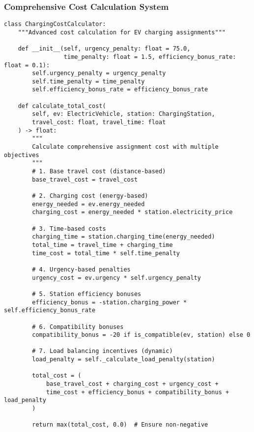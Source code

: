 \documentclass[12pt,a4paper]{article}
\begin{document}
\subsubsection{Comprehensive Cost Calculation System}

\begin{lstlisting}[caption=Multi-Component Cost Calculator,label=lst:cost]
class ChargingCostCalculator:
    """Advanced cost calculation for EV charging assignments"""
    
    def __init__(self, urgency_penalty: float = 75.0, 
                 time_penalty: float = 1.5, efficiency_bonus_rate: float = 0.1):
        self.urgency_penalty = urgency_penalty
        self.time_penalty = time_penalty
        self.efficiency_bonus_rate = efficiency_bonus_rate
    
    def calculate_total_cost(
        self, ev: ElectricVehicle, station: ChargingStation,
        travel_cost: float, travel_time: float
    ) -> float:
        """
        Calculate comprehensive assignment cost with multiple objectives
        """
        # 1. Base travel cost (distance-based)
        base_travel_cost = travel_cost
        
        # 2. Charging cost (energy-based)
        energy_needed = ev.energy_needed
        charging_cost = energy_needed * station.electricity_price
        
        # 3. Time-based costs
        charging_time = station.charging_time(energy_needed)
        total_time = travel_time + charging_time
        time_cost = total_time * self.time_penalty
        
        # 4. Urgency-based penalties
        urgency_cost = ev.urgency * self.urgency_penalty
        
        # 5. Station efficiency bonuses
        efficiency_bonus = -station.charging_power * self.efficiency_bonus_rate
        
        # 6. Compatibility bonuses
        compatibility_bonus = -20 if is_compatible(ev, station) else 0
        
        # 7. Load balancing incentives (dynamic)
        load_penalty = self._calculate_load_penalty(station)
        
        total_cost = (
            base_travel_cost + charging_cost + urgency_cost + 
            time_cost + efficiency_bonus + compatibility_bonus + load_penalty
        )
        
        return max(total_cost, 0.0)  # Ensure non-negative
    

\end{lstlisting}
\end{document}
